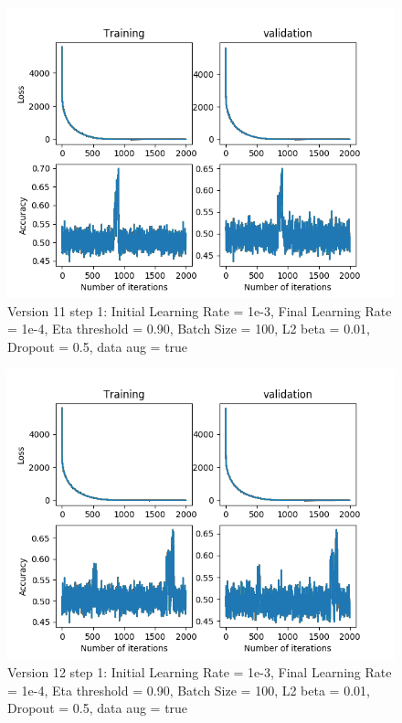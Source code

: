 \documentclass[12pt,reqno]{amsart}
\numberwithin{equation}{section}
\begin{document}
\begin{enumerate}
\begin{figure}[H]
\centering
\includegraphics[scale=0.6]{data_liquid140_version11_step1}
\caption{Version 11 step 1: Initial Learning Rate = 1e-3, Final Learning Rate = 1e-4, Eta threshold = 0.90, Batch Size = 100, L2 beta = 0.01, Dropout = 0.5, data aug = true}
\end{figure}

\begin{figure}[H]
\centering
\includegraphics[scale=0.6]{data_liquid140_version12_step1}
\caption{Version 12 step 1: Initial Learning Rate = 1e-3, Final Learning Rate = 1e-4, Eta threshold = 0.90, Batch Size = 100, L2 beta = 0.01, Dropout = 0.5, data aug = true}
\end{figure}


\end{enumerate}
\end{document}
